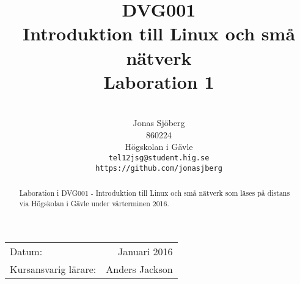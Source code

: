 \documentclass[11pt,a4paper]{article}
\title{DVG001                                  \\ 
       Introduktion till Linux och små nätverk \\ 
       Laboration 1}
\author{                                 \\
  Jonas Sjöberg                          \\
  860224                                 \\
  Högskolan i Gävle                      \\
  \texttt{tel12jsg@student.hig.se}       \\
  \texttt{https://github.com/jonasjberg} \\
}
\date{}
\begin{document}
  \maketitle

  \begin{center}
  \begin{tabular}{l r}
    Datum:               & Januari 2016   \\
    Kursansvarig lärare: & Anders Jackson
  \end{tabular}
  \end{center}

  \begin{abstract}
    Laboration i DVG001 - Introduktion till Linux och små nätverk som läses på distans via Högskolan i Gävle under vårterminen 2016.
  \end{abstract}

  \newpage
  \setcounter{tocdepth}{3}
  \tableofcontents
  \newpage

  
  
% 

\end{document}
